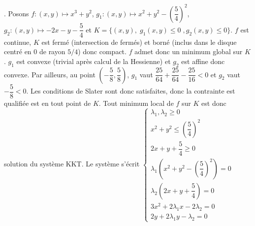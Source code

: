 \documentclass{fancybook}
\begin{document}
\newline
{}. Posons $f:(x,y)\mapsto x^3+y^2$, $g_1:(x,y)\mapsto x^2+y^2-\left(\dfrac{5}{4}\right)^2$, $g_2:(x,y)\mapsto -2x-y-\dfrac 54$ et $K=\{(x,y),\; g_1(x,y)\leq 0\;, g_2(x,y)\leq 0\}$. \newline
\newline 
$f$ est continue, $K$ est fermé (intersection de fermés) et borné (inclus dans le disque centré en $0$ de rayon $5/4$) donc compact. $f$ admet donc un minimum global sur $K$.\newline
\newline 
$g_1$ est convexe (trivial après calcul de la Hessienne) et $g_2$ est affine donc convexe. Par ailleurs, au point $(-\dfrac 58,\dfrac 58)$, $g_1$ vaut $\dfrac{25}{64} +\dfrac{25}{64} -\dfrac{25}{16}<0$ et $g_2$ vaut $-\dfrac 58<0$. Les conditions de Slater sont donc satisfaites, donc la contrainte est qualifiée est en tout point de $K$. Tout minimum local de $f$ sur $K$ est donc solution du système KKT.\newline
Le système s'écrit $\begin{cases}
\lambda_1, \lambda_2 \geq 0 \\
x^2+y^2\leq \left(\dfrac{5}{4}\right)^2 \\
2x+y+\dfrac{5}{4}\geq 0 \\
\lambda_1(x^2+y^2- \left(\dfrac{5}{4}\right)^2) = 0 \\
\lambda_2(2x+y+\dfrac{5}{4}) = 0 \\
3x^2 + 2\lambda_1 x- 2\lambda_2 = 0 \\
2y + 2\lambda_1 y - \lambda_2 = 0
\end{cases}$ \newline
\end{document}
